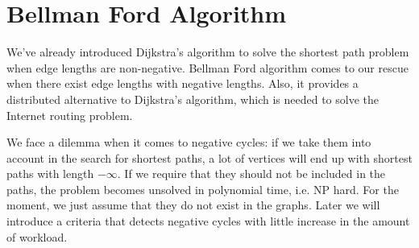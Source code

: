 \section{Bellman Ford Algorithm}
We've already introduced Dijkstra's algorithm to solve the shortest path problem when edge lengths are non-negative. Bellman Ford algorithm comes to our rescue when there exist edge lengths with negative lengths. Also, it provides a distributed alternative to Dijkstra's algorithm, which is needed to solve the Internet routing problem.
\begin{description}
\end{description} 
We face a dilemma when it comes to negative cycles: if we take them into account in the search for shortest paths, a lot of vertices will end up with shortest paths with length $-\infty$. If we require that they should not be included in the paths, the problem becomes unsolved in polynomial time, i.e. NP hard. For the moment, we just assume that they do not exist in the graphs. Later we will introduce a criteria that detects negative cycles with little increase in the amount of workload. 
